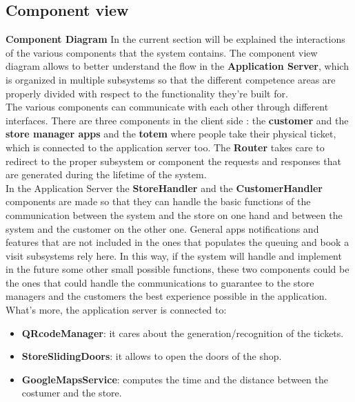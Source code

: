 \documentclass[]{article}
\begin{document}
	\subsection{Component view}
	\textbf{} \newline
	\textbf{Component Diagram} \newline
	In the current section will be explained the interactions of the various components that the system contains. The component view diagram allows to better understand the flow in the \textbf{Application Server}, which is organized in multiple subsystems so that the different competence areas are properly divided with respect to the functionality they’re built for.\\
The various components can communicate with each other through different interfaces. 
There are three components in the client side : the \textbf{customer} and the \textbf{store manager apps} and the \textbf{totem} where people take their physical ticket, which is connected to the application server too. The \textbf{Router} takes care to redirect to the proper subsystem or component the requests and responses that are generated during the lifetime of the system.\\
In the Application Server the \textbf{StoreHandler} and the \textbf{CustomerHandler} components are made so that they can handle the basic functions of the communication between the system and the store on one hand and between the system and the customer on the other one. General apps notifications and features that are not included in the ones that populates the queuing and book a visit subsystems rely here. In this way, if the system will handle and implement in the future some other small possible functions, these two components could be the ones that could handle the communications to guarantee to the store managers and the customers the best experience possible in the application.\newline\newline
What’s more, the application server is connected to:\\
	\begin{itemize}
		\item 	\textbf{QRcodeManager}: it cares about the generation/recognition of the tickets.
		
		\item 	\textbf{StoreSlidingDoors}: it allows to open the doors of the shop.
		
		\item 	\textbf{GoogleMapsService}: computes the time and the distance between the costumer and the store.	
	
	\end{itemize}
	
\end{document}
